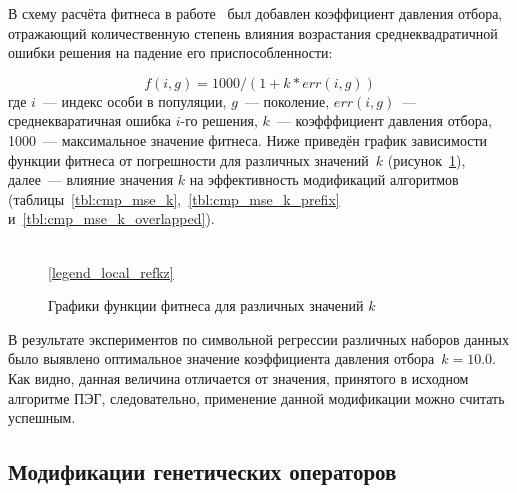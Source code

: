 В схему расчёта фитнеса в работе~\cite{Lopes:2004:AMCS} был добавлен коэффициент давления отбора, отражающий количественную степень влияния возрастания среднеквадратичной ошибки решения на падение его приспособленности:

\begin{equation}
\label{eq:EGIPSYS_fitness}
f(i, g) = 1000 / (1 + k * err(i, g))
\end{equation}
где $i$~--- индекс особи в популяции, $g$~--- поколение, $err(i, g)$~--- среднекваратичная ошибка $i$-го решения, $k$~--- коэфффициент давления отбора, 1000~--- максимальное значение фитнеса. Ниже приведён график зависимости функции фитнеса от погрешности для различных значений~$k$ (рисунок~\ref{img:kz}), далее~--- влияние значения $k$ на эффективность модификаций алгоритмов (таблицы~\ref{tbl:cmp_mse_k},~\ref{tbl:cmp_mse_k_prefix} и~\ref{tbl:cmp_mse_k_overlapped}).

\begin{figure} [h]
  \center
  \\
  \ref{legend_local_refkz}
  \caption{Графики функции фитнеса для различных значений $k$}
  \label{img:kz}
\end{figure}







В результате экспериментов по символьной регрессии различных наборов данных было выявлено оптимальное значение коэффициента давления отбора~$k=10.0$. Как видно, данная величина отличается от значения, принятого в исходном алгоритме ПЭГ, следовательно, применение данной модификации можно считать успешным. 


\subsection{Модификации генетических операторов}

